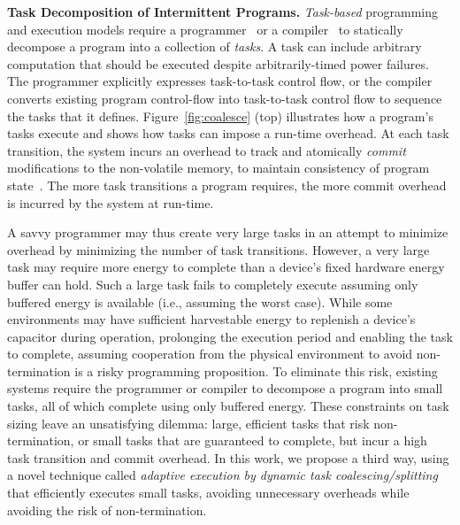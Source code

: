 \textbf{Task Decomposition of Intermittent Programs.} {\em
Task-based} programming and execution models require a
programmer~\citep{alpaca,chain} or a compiler~\cite{baghsorkhi_cgo_2018} to
statically decompose a program into a collection of {\em tasks}.  A task can
include arbitrary computation that should be executed despite arbitrarily-timed power failures.
%
The programmer explicitly expresses task-to-task control flow, or the compiler
converts existing program control-flow into task-to-task control flow to sequence 
the tasks that it defines.
%
Figure~\ref{fig:coalesce} (top) illustrates how a program's tasks execute and
shows how tasks can impose a run-time overhead. 
%
At each task transition, the system incurs an overhead to track and atomically
\emph{commit} modifications to the non-volatile memory, to maintain consistency of
program state~\citep{chain,alpaca}.  
%
The more task transitions a program requires, the more commit overhead is incurred by the system at run-time.

A savvy programmer may thus create very large tasks in an attempt to minimize
overhead by minimizing the number of task transitions.  However, a very large
task may require more energy to complete than a device's fixed hardware energy
buffer can hold.  Such a large task fails to completely execute assuming only
buffered energy is available (i.e., assuming the worst case).  While some
environments may have sufficient harvestable energy to replenish a device's
capacitor during operation, prolonging the execution period and enabling the
task to complete, assuming cooperation from the physical environment to avoid
non-termination is a risky programming proposition.  To eliminate this risk,
existing systems require the programmer or compiler to decompose a  program
into small tasks, all of which complete using only buffered energy.  These
constraints on task sizing leave an unsatisfying dilemma: large, efficient
tasks that risk non-termination, or small tasks that are guaranteed to
complete, but incur a high task transition and commit overhead.  In this work,
we propose a third way, using a novel technique called {\em adaptive execution by dynamic task
coalescing/splitting} that efficiently executes small tasks, avoiding unnecessary overheads while avoiding the risk of non-termination.

